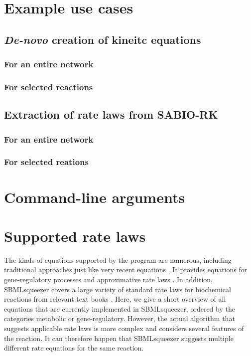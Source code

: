 \chapter{Example use cases}

\section{\emph{De-novo} creation of kineitc equations}
\subsection{For an entire network}
\subsection{For selected reactions}
\section{Extraction of rate laws from SABIO-RK}
\subsection{For an entire network}
\subsection{For selected reations}


\chapter{Command-line arguments}

\chapter{Supported rate laws}\label{chap:RateLaws}

The kinds of equations supported by the program are
numerous, including traditional approaches \citep{Guldberg1879, Michaelis1913}
just like very recent equations \citep{Liebermeister2006, Liebermeister2010}.
It provides equations for gene-regulatory processes
\citep{Hinze2007, Radde2007a, Toepfer2007, Vu2007,Weaver1999} and approximative
rate laws \citep{Savageau1969}.
In addition, SBMLsqueezer covers a large variety of standard rate laws for
biochemical reactions from relevant text books
\citep{Segel1993, Heinrich1996, Bisswanger2000, Cornish-Bowden2004}.
Here, we give a short overview of all equations that are currently implemented
in SBMLsqueezer, ordered by the categories metabolic or gene-regulatory.
However, the actual algorithm that suggests applicable rate laws is more complex
and considers several features of the reaction.
It can therefore happen that SBMLsqueezer suggests multiple different rate
equations for the same reaction.

